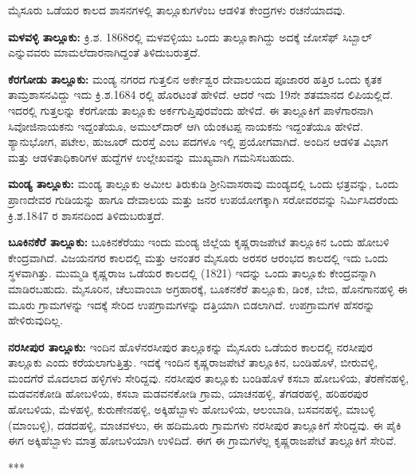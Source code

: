ಮೈಸೂರು ಒಡೆಯರ ಕಾಲದ ಶಾಸನಗಳಲ್ಲಿ ತಾಲ್ಲೂಕುಗಳೆಂಬ ಆಡಳಿತ ಕೇಂದ್ರಗಳು ರಚನೆಯಾದವು.

\textbf{ಮಳವಳ್ಳಿ ತಾಲ್ಲೂಕು:} ಕ್ರಿ.ಶ. 1868ರಲ್ಲಿ ಮಳವಳ್ಳಿಯು ಒಂದು ತಾಲ್ಲೂಕಾಗಿದ್ದು ಅದಕ್ಕೆ ಜೋಸೆಫ್​ ಸಿಬ್ಬಾಲ್​ ಎನ್ನುವವರು ಮಾಮಲೆದಾರ\-ನಾಗಿದ್ದಂತೆ ತಿಳಿದುಬರುತ್ತದೆ.

\textbf{ಕೆರಗೋಡು ತಾಲ್ಲೂಕು:} ಮಂಡ್ಯ ನಗರದ ಗುತ್ತಲಿನ ಅರ್ಕೇಶ್ವರ ದೇವಾಲಯದ ಪೂಜಾರರ ಹತ್ತಿರ ಒಂದು ಕೃತಕ ತಾಮ್ರಶಾಸನವಿದ್ದು ಇದು ಕ್ರಿ.ಶ.1684 ರಲ್ಲಿ ಹೊರಟಂತೆ ಹೇಳಿದೆ. ಆದರೆ ಇದು 19ನೇ ಶತಮಾನದ ಲಿಪಿಯಲ್ಲಿದೆ. ಇದರಲ್ಲಿ ಗುತ್ತಲನ್ನು ಕೆರಗೋಡು ತಾಲ್ಲೂಕು ಅರ್ಕಗುಪ್ತಿಪುರವೆಂದು ಹೇಳಿದೆ. ಈ ತಾಲ್ಲೂಕಿಗೆ ಪಾಳೆಗಾರನಾಗಿ ಸಿವೋಜಿನಾಯಕನು ಇದ್ದಂತೆಯೂ, ಅಮುಲ್​ದಾರ್​ ಆಗಿ ಯೆಂಕಟಪ್ಪ ನಾಯಕನು ಇದ್ದಂತೆಯೂ ಹೇಳಿದೆ. ಶ್ಯಾನುಭೋಗ, ಪಟೇಲ, ಹುಜೂರ್​ ದುರಸ್ತೆ ಎಂಬ ಪದಗಳೂ ಇಲ್ಲಿ ಪ್ರಯೋಗವಾಗಿದೆ. ಅಂದಿನ ಆಡಳಿತ ವಿಭಾಗ ಮತ್ತು ಆಡಳಿತಾಧಿಕಾರಿಗಳ ಹುದ್ದೆಗಳ ಉಲ್ಲೇಖವನ್ನು ಮುಖ್ಯವಾಗಿ ಗಮನಿಸಬಹುದು.

\textbf{ಮಂಡ್ಯ ತಾಲ್ಲೂಕು: }ಮಂಡ್ಯ ತಾಲ್ಲೂಕು ಅಮೀಲ ತಿರುಕುಡಿ ಶ‍್ರೀನಿವಾಸರಾವು ಮಂಡ್ಯದಲ್ಲಿ ಒಂದು ಛತ್ರವನ್ನು, ಒಂದು ಪ್ರಾಣದೇವರ ಗುಡಿಯನ್ನು ಹಾಗೂ ದೇವಾಲಯ ಮತ್ತು ಜನರ ಉಪಯೋಗಕ್ಕಾಗಿ ಸರೋವರವನ್ನು ನಿರ್ಮಿಸಿದರೆಂದು ಕ್ರಿ.ಶ.1847 ರ ಶಾಸನದಿಂದ ತಿಳಿದುಬರುತ್ತದೆ.

\textbf{ಬೂಕಿನಕೆರೆ ತಾಲ್ಲೂಕು:} ಬೂಕಿನಕೆರೆಯು ಇಂದು ಮಂಡ್ಯ ಜಿಲ್ಲೆಯ ಕೃಷ್ಣರಾಜಪೇಟೆ ತಾಲ್ಲೂಕಿನ ಒಂದು ಹೋಬಳಿ ಕೇಂದ್ರವಾಗಿದೆ. ವಿಜಯನಗರ ಕಾಲದಲ್ಲಿ ಮತ್ತು ಆನಂತರ ಮೈಸೂರು ಅರಸರ ಆರಂಭದ ಕಾಲದಲ್ಲಿ ಇದು ಒಂದು ಸ್ಥಳವಾಗಿತ್ತು. ಮುಮ್ಮಡಿ ಕೃಷ್ಣರಾಜ ಒಡೆಯರ ಕಾಲದಲ್ಲಿ (1821) ಇದನ್ನು ಒಂದು ತಾಲ್ಲೂಕು ಕೇಂದ್ರವನ್ನಾಗಿ ಮಾಡಿರಬಹುದು. ಮೈಸೂರಿನ, ಚೆಲುವಾಂಬಾ ಅಗ್ರಹಾರಕ್ಕೆ, ಬೂಕನಕೆರೆ ತಾಲ್ಲೂಕು, ಡಿಂಕ, ಬೇಬಿ, ಹೊನಗಾನಹಳ್ಳಿ ಈ ಮೂರು ಗ್ರಾಮಗಳನ್ನು ಇದಕ್ಕೆ ಸೇರಿದ ಉಪಗ್ರಾಮಗಳನ್ನು ದತ್ತಿಯಾಗಿ ಬಿಡಲಾಗಿದೆ. ಉಪಗ್ರಾಮಗಳ ಹೆಸರನ್ನು ಹೇಳಿರುವುದಿಲ್ಲ.

\newpage

\textbf{ನರಸೀಪುರ ತಾಲ್ಲೂಕು:} ಇಂದಿನ ಹೊಳೆನರಸೀಪುರ ತಾಲ್ಲೂಕನ್ನು ಮೈಸೂರು ಒಡೆಯರ ಕಾಲದಲ್ಲಿ ನರಸೀಪುರ ತಾಲ್ಲೂಕು ಎಂದು ಕರೆಯಲಾಗುತ್ತಿತ್ತು. ಇದಕ್ಕೆ ಇಂದಿನ ಕೃಷ್ಣರಾಜಪೇಟೆ ತಾಲ್ಲೂಕಿನ, ಬಂಡಿಹೊಳೆ, ಬೀರುವಳ್ಳಿ, ಮಂದಗೆರೆ ಮೊದಲಾದ ಹಳ್ಳಿಗಳು ಸೇರಿದ್ದವು. ನರಸೀಪುರ ತಾಲ್ಲೂಕು ಬಂಡಿಹೊಳೆ ಕಸಬಾ ಹೋಬಳಿಯ, ತೆರಣೆನಹಳ್ಳಿ, ಮಡವನಕೋಡಿ ಹೋಬಳಿಯ, ಕಸಬಾ ಮಡವನಕೋಡಿ ಗ್ರಾಮ, ಯಾಚನಹಳ್ಳಿ, ತೆಗಡರಹಳ್ಳಿ, ಹರಿಹರಪುರ ಹೋಬಳಿಯ, ಮೆಳಹಳ್ಳಿ, ಕುರುಣೇನಹಳ್ಳಿ, ಅಕ್ಕಿಹೆಬ್ಬಾಳು ಹೋಬಳಿಯ, ಆಲಂಬಾಡಿ, ಬಸವನಹಳ್ಳಿ, ಮಾಬಳ್ಳಿ (ಮಾಂಬಳ್ಳಿ), ದಡದಹಳ್ಳಿ, ಮಾಚವಳಲು, ಈ ಹದಿಮೂರು ಗ್ರಾಮಗಳು ನರಸೀಪುರ ತಾಲ್ಲೂಕಿಗೆ ಸೇರಿದ್ದವು. ಈ ಪೈಕಿ ಈಗ ಅಕ್ಕಿಹೆಬ್ಬಾಳು ಮಾತ್ರ ಹೋಬಳಿಯಾಗಿ ಉಳಿದಿದೆ. ಈಗ ಈ ಗ್ರಾಮಗಳೆಲ್ಲ ಕೃಷ್ಣರಾಜಪೇಟೆ ತಾಲ್ಲೂಕಿಗೆ ಸೇರಿವೆ.

\begin{center}
***
\end{center}

\theendnotes

